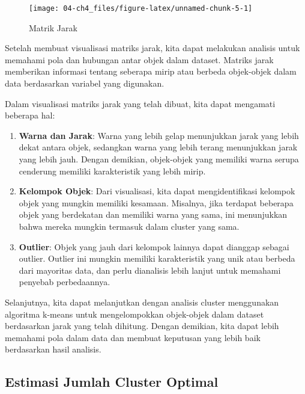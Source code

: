 \documentclass[
  oneside]{book}
\begin{document}
\begin{figure}[h]

{\centering \texttt{[image: 04-ch4\_files/figure-latex/unnamed-chunk-5-1]} 

}

\caption{Matrik Jarak}\label{fig:unnamed-chunk-5}
\end{figure}

Setelah membuat visualisasi matriks jarak, kita dapat melakukan analisis untuk memahami pola dan hubungan antar objek dalam dataset. Matriks jarak memberikan informasi tentang seberapa mirip atau berbeda objek-objek dalam data berdasarkan variabel yang digunakan.

Dalam visualisasi matriks jarak yang telah dibuat, kita dapat mengamati beberapa hal:

\begin{enumerate}
\def\labelenumi{\arabic{enumi}.}
\item
  \textbf{Warna dan Jarak}:
  Warna yang lebih gelap menunjukkan jarak yang lebih dekat antara objek, sedangkan warna yang lebih terang menunjukkan jarak yang lebih jauh. Dengan demikian, objek-objek yang memiliki warna serupa cenderung memiliki karakteristik yang lebih mirip.
\item
  \textbf{Kelompok Objek}:
  Dari visualisasi, kita dapat mengidentifikasi kelompok objek yang mungkin memiliki kesamaan. Misalnya, jika terdapat beberapa objek yang berdekatan dan memiliki warna yang sama, ini menunjukkan bahwa mereka mungkin termasuk dalam cluster yang sama.
\item
  \textbf{Outlier}:
  Objek yang jauh dari kelompok lainnya dapat dianggap sebagai outlier. Outlier ini mungkin memiliki karakteristik yang unik atau berbeda dari mayoritas data, dan perlu dianalisis lebih lanjut untuk memahami penyebab perbedaannya.
\end{enumerate}

Selanjutnya, kita dapat melanjutkan dengan analisis cluster menggunakan algoritma k-means untuk mengelompokkan objek-objek dalam dataset berdasarkan jarak yang telah dihitung. Dengan demikian, kita dapat lebih memahami pola dalam data dan membuat keputusan yang lebih baik berdasarkan hasil analisis.

\subsection*{Estimasi Jumlah Cluster Optimal}\label{estimasi-jumlah-cluster-optimal}
\end{document}
